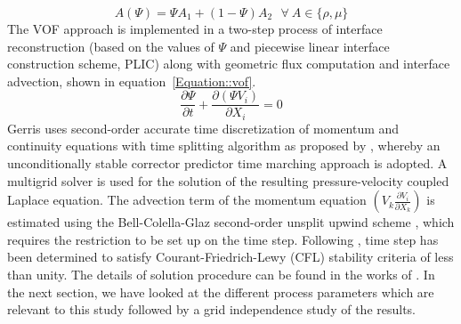\begin{equation} \label{Equation::general}
A (\Psi) = \Psi A_1 + (1-\Psi)A_2 \: \: \:  \forall  \: A \in \{\rho, \mu\}
\end{equation}
The VOF approach is implemented in a two-step process of interface reconstruction (based on the values of $\Psi$ and piecewise linear interface construction scheme, PLIC) along with geometric flux computation and interface advection, shown in equation~\ref{Equation::vof}.
\begin{equation} \label{Equation::vof}
\frac{\partial \Psi}{\partial t} + \frac{\partial(\Psi V_i)}{\partial X_i} = 0
\end{equation}
Gerris uses second-order accurate time discretization of momentum and continuity equations with time splitting algorithm as proposed by \cite{Chorin1968}, whereby an unconditionally stable corrector predictor time marching approach is adopted. A multigrid solver is used for the solution of the resulting pressure-velocity coupled Laplace equation. The advection term of the momentum equation $\left(V_k\frac{\partial V_i}{\partial X_k}\right)$ is estimated using the Bell-Colella-Glaz second-order unsplit upwind scheme \citep{bell1989second}, which requires the restriction to be set up on the time step. Following \cite{popinet2009}, time step has been determined to satisfy Courant-Friedrich-Lewy (CFL) stability criteria of less than unity. The details of solution procedure can be found in the works of \cite{Popinet2003,popinet2009}. In the next section, we have looked at the different process parameters which are relevant to this study followed by a grid independence study of the results.\\

